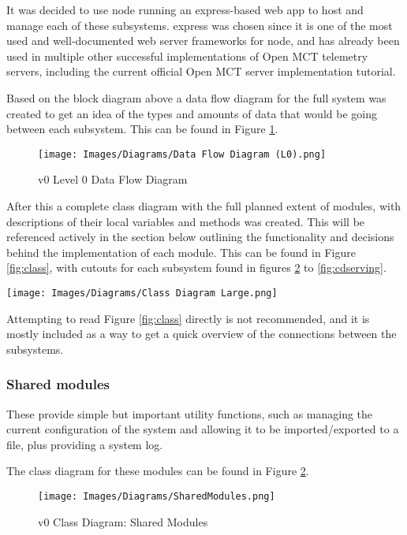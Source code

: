 It was decided to use \Gls{node} running an \Gls{express}-based web app to host and manage each of these subsystems. \Gls{express} was chosen since it is one of the most used and well-documented web server frameworks for \Gls{node}, and has already been used in multiple other successful implementations of Open MCT telemetry servers, including the current official Open MCT server implementation tutorial.

Based on the block diagram above a data flow diagram for the full system was created to get an idea of the types and amounts of data that would be going between each subsystem. This can be found in Figure \ref{fig:dfd}.

\begin{figure}[H]
  \centering
  \texttt{[image: Images/Diagrams/Data Flow Diagram (L0).png]}
  \caption{v0 Level 0 Data Flow Diagram}
  \label{fig:dfd}
\end{figure}

After this a complete class diagram with the full planned extent of modules, with descriptions of their local variables and methods was created. This will be referenced actively in the section below outlining the functionality and decisions behind the implementation of each module. This can be found in Figure \ref{fig:class}, with cutouts for each subsystem found in figures \ref{fig:cdshared} to \ref{fig:cdserving}.

\begin{sidewaysfigure}[ht]
  \centering
  \texttt{[image: Images/Diagrams/Class Diagram Large.png]}
  \caption{v0 Class Diagram Overview}
  \label{fig:class}
\end{sidewaysfigure}

Attempting to read Figure \ref{fig:class} directly is not recommended, and it is mostly included as a way to get a quick overview of the connections between the subsystems.

\subsubsection{Shared modules}
These provide simple but important utility functions, such as managing the current configuration of the system and allowing it to be imported/exported to a file, plus providing a system log.

The class diagram for these modules can be found in Figure \ref{fig:cdshared}.

\begin{figure}[H]
  \centering
  \texttt{[image: Images/Diagrams/SharedModules.png]}
  \caption{v0 Class Diagram: Shared Modules}
  \label{fig:cdshared}
\end{figure}

